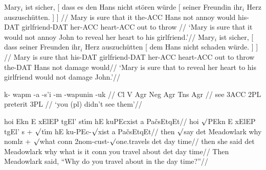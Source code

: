 \documentclass[12pt]{article}
\def\suff#1{{\footnotesize -#1}}
\begin{document}
\pex
\a
\begingl
\gla Mary$_i$ ist sicher, [ dass es den Hans nicht st\"oren w\"urde
[ seiner Freundin ihr$_i$ Herz auszusch\"utten. ] ] //
\glb Mary is sure that it the\suff{ACC} Hans not annoy would
his\suff{DAT} girlfriend\suff{DAT} her\suff{ACC} heart\suff{ACC} {out to
throw} //
\glft `Mary is sure that it would not annoy John to reveal her
heart to his girlfriend.'//
\endgl
\a
\begingl
\gla Mary$_i$ ist sicher, [ dass seiner Freunden ihr$_i$ Herz
auszuch\"utten [ dem Hans nicht schaden w\"urde. ] ] //
\glb Mary is sure that his\suff{DAT} girlfriend\suff{DAT} her\suff{ACC}
heart\suff{ACC} {out to throw} the\suff{DAT} Hans not damage would//
\glft `Mary is sure that to reveal her heart to his girlfriend
would not damage John.'//
\endgl
\xe

\ex
\begingl
\gla k- wapm -a -s'i -m -wapunin -uk //
\glb Cl V Agr Neg Agr Tns Agr //
 see {3\sc ACC} {} 2{\sc PL} preterit 3{\sc PL} //
\glft `you (pl) didn't see them'//
\endgl
\xe

\ex
\def\mroot{$\surd$}%
\let\L=\textbeltl%
\def\W{}%
\begingl
\gla[everygla=\tipaencoding] hoi Ekn {\L}E {x\W}ElEP t{g\W}El' st{\'\i}m {hE\L}
   {kuPEcx\W ist} {\L a} Pa{\v c}sEtqEt//
\glb[everyglb=\tipaencoding] hoi {\mroot}PEkn {\L}E {x\W}ElEP t{g\W}El' {s +
   \mroot t\'\i m} {hE\L} ku-PEc-\mroot{x\W}ist {\L}a Pa{\v c}sEtqEt//
\glb then {\mroot}say det Meadowlark why {nomlz + \mroot what} conn
   2nom-cust-{\mroot}one.travels det {day time}//
\glb then {she said} det Meadowlark why {what is it} conn {you travel
   about} det {day time}//
\glft Then Meadowlark said, ``Why do you travel about in the day
   time?''//
\endgl
\xe
\end{document}
